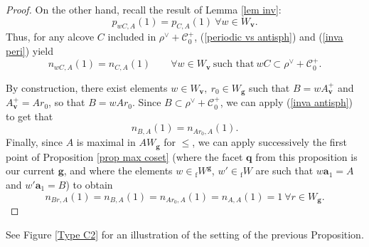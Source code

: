 \documentclass[11pt]{amsart}
\theoremstyle{plain}
\theoremstyle{remark}
\numberwithin{equation}{section}
\begin{document}
\begin{proof}
		On the other hand, recall the result of Lemma \ref{lem inv}:
		\begin{equation}\label{inva peri}
			p_{wC,A}(1)=p_{C,A}(1) ~\forall w\in W_{\mathbf{v}}.
		\end{equation}
		Thus, for any alcove $C$  included in $\rho^\vee+\mathscr{C}^+_0$, (\ref{periodic vs antisph}) and (\ref{inva peri}) yield
		\begin{equation}\label{inva antisph}
			n_{wC,A}(1)=n_{C,A}(1) \qquad\forall w\in W_{\mathbf{v}}~\text{such that}~wC\subset \rho^\vee+\mathscr{C}^+_0.
		\end{equation}
		
		By construction, there exist elements $w\in W_\mathbf{v},~r_0\in W_\mathbf{g}$ such that $B=wA^+_\mathbf{v}$ and $A^+_\mathbf{v}=Ar_0$, so that $B=wAr_0$. Since $B\subset\rho^\vee+\mathscr{C}^+_0$, we can apply (\ref{inva antisph}) to get that
		$$n_{B,A}(1)=n_{Ar_0,A}(1). $$
		Finally, since $A$ is maximal in $AW_\mathbf{g}$ for $\leq$, we can apply successively the first point of Proposition \ref{prop max coset} (where the facet $\mathbf{q}$ from this proposition is our current $\mathbf{g}$, and where the elements $w\in{_\mathrm{f}W}^\mathbf{g}$, $w'\in{_\mathrm{f}W}$ are such that $w\mathbf{a}_1=A$ and $w'\mathbf{a}_1=B$) to obtain
		$$n_{Br,A}(1)=n_{B,A}(1)=n_{Ar_0,A}(1)=n_{A,A}(1)=1~\forall r\in W_\mathbf{g}. $$
	\end{proof}
	See Figure \ref{Type C2} for an illustration of the setting of the previous Proposition.
\end{document}

